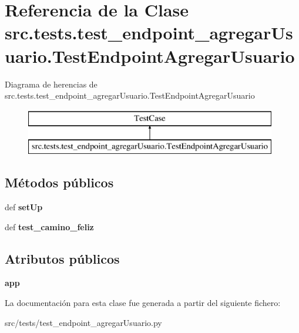 \hypertarget{classsrc_1_1tests_1_1test__endpoint__agregar_usuario_1_1_test_endpoint_agregar_usuario}{\section{Referencia de la Clase src.\-tests.\-test\-\_\-endpoint\-\_\-agregar\-Usuario.\-Test\-Endpoint\-Agregar\-Usuario}
\label{classsrc_1_1tests_1_1test__endpoint__agregar_usuario_1_1_test_endpoint_agregar_usuario}
}
Diagrama de herencias de src.\-tests.\-test\-\_\-endpoint\-\_\-agregar\-Usuario.\-Test\-Endpoint\-Agregar\-Usuario\begin{figure}[H]
\begin{center}
\leavevmode
\includegraphics[height=2.000000cm]{classsrc_1_1tests_1_1test__endpoint__agregar_usuario_1_1_test_endpoint_agregar_usuario}
\end{center}
\end{figure}
\subsection*{Métodos públicos}
\begin{DoxyCompactItemize}
\item 
\hypertarget{classsrc_1_1tests_1_1test__endpoint__agregar_usuario_1_1_test_endpoint_agregar_usuario_a725f15bfe70bc76b22342edd8f8473b1}{def {\bfseries set\-Up}}\label{classsrc_1_1tests_1_1test__endpoint__agregar_usuario_1_1_test_endpoint_agregar_usuario_a725f15bfe70bc76b22342edd8f8473b1}

\item 
\hypertarget{classsrc_1_1tests_1_1test__endpoint__agregar_usuario_1_1_test_endpoint_agregar_usuario_ac876520e648243180e4bb64af6803f18}{def {\bfseries test\-\_\-camino\-\_\-feliz}}\label{classsrc_1_1tests_1_1test__endpoint__agregar_usuario_1_1_test_endpoint_agregar_usuario_ac876520e648243180e4bb64af6803f18}

\end{DoxyCompactItemize}
\subsection*{Atributos públicos}
\begin{DoxyCompactItemize}
\item 
\hypertarget{classsrc_1_1tests_1_1test__endpoint__agregar_usuario_1_1_test_endpoint_agregar_usuario_a86227ccbacc49f4c3cbaeba5ca078c87}{{\bfseries app}}\label{classsrc_1_1tests_1_1test__endpoint__agregar_usuario_1_1_test_endpoint_agregar_usuario_a86227ccbacc49f4c3cbaeba5ca078c87}

\end{DoxyCompactItemize}


La documentación para esta clase fue generada a partir del siguiente fichero\-:\begin{DoxyCompactItemize}
\item 
src/tests/test\-\_\-endpoint\-\_\-agregar\-Usuario.\-py\end{DoxyCompactItemize}
